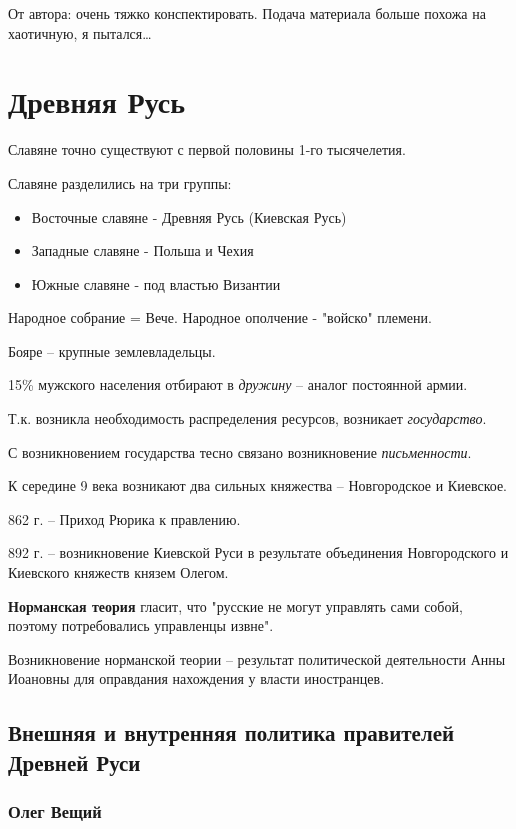 \begin{note}
От автора: очень тяжко конспектировать. Подача материала больше похожа на хаотичную, я пытался\ldots 
\end{note}

\section{Древняя Русь}

Славяне точно существуют с первой половины 1-го тысячелетия.

Славяне разделились на три группы:
\begin{itemize} 
  \item Восточные славяне - Древняя Русь (Киевская Русь)
  \item Западные славяне - Польша и Чехия
  \item Южные славяне - под властью Византии
\end{itemize}

Народное собрание = Вече.
Народное ополчение - "войско" племени.

Бояре -- крупные землевладельцы.

15\% мужского населения отбирают в \textit{дружину} -- аналог постоянной армии.

Т.к. возникла необходимость распределения ресурсов, возникает \textit{государство}.

С возникновением государства тесно связано возникновение \textit{письменности}.

К середине 9 века возникают два сильных княжества -- Новгородское и Киевское.

862 г. -- Приход Рюрика к правлению.

892 г. -- возникновение Киевской Руси в результате объединения Новгородского и Киевского княжеств князем Олегом.

\textbf{Норманская теория} гласит, что "русские не могут управлять сами собой, поэтому потребовались управленцы извне".

Возникновение норманской теории -- результат политической деятельности Анны Иоановны для оправдания нахождения у власти иностранцев.

\subsection{Внешняя и внутренняя политика правителей Древней Руси}

\subsubsection*{Олег Вещий}

